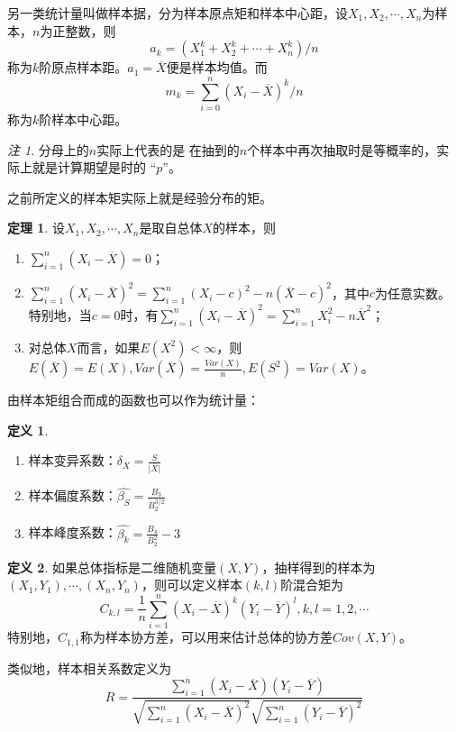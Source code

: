 \documentclass[a4paper,11pt]{article}%
\theoremstyle{remark}
\newtheorem*{remark}{注}
\theoremstyle{remark}
\theoremstyle{definition}
\newtheorem{theorem}{定理}[section]
\theoremstyle{definition}
\newtheorem*{definition}{定义}
\theoremstyle{plain}
\newcommand*{\abs}[1]{\lvert #1 \rvert}
\begin{document}
另一类统计量叫做样本据，分为样本原点矩和样本中心距，设$X_1,X_2,\cdots,X_n$为样本，$n$为正整数，则
\[a_k=(X_1^k+X_2^k+\cdots+X_n^k)/n\]
称为$k$阶原点样本距。$a_1=\overline{X}$便是样本均值。而
\[m_k=\sum_{i=0}^n(X_i-\overline{X})^k/n\]
称为$k$阶样本中心距。
\begin{remark}
    分母上的$n$实际上代表的是 在抽到的$n$个样本中再次抽取时是等概率的，实际上就是计算期望是时的 “$p$”。    
\end{remark}

之前所定义的样本矩实际上就是经验分布的矩。
\begin{theorem}
    设$X_1,X_2,\cdots,X_n$是取自总体$X$的样本，则
    \begin{enumerate}
        \item$\sum_{i=1}^n(X_i-\overline{X})=0$；
        \item$\sum_{i=1}^{n}(X_i-\overline{X})^2=\sum_{i=1}^{n}(X_i-c)^2-n(\overline{X}-c)^2$，其中$c$为任意实数。特别地，当$c=0$时，有$\sum_{i=1}^{n}(X_i-\overline{X})^2=\sum_{i=1}^{n}X_i^2-n\overline{X}^2$；
        \item 对总体$X$而言，如果$E(X^2)<\infty$，则$E(\overline{X})=E(X),Var(\overline{X})=\frac{Var(X)}{n},E(S^2)=Var(X)$。
    \end{enumerate}
\end{theorem}
由样本矩组合而成的函数也可以作为统计量：
\begin{definition}
    \begin{enumerate}
        \item 样本变异系数：$\delta_X=\frac{S}{\abs{\overline{X}}}$
        \item 样本偏度系数：$\hat{\beta_S}=\frac{B_3}{B_2^{3/2}}$
        \item 样本峰度系数：$\hat{\beta_k}=\frac{B_4}{B_2^{2}}-3$
    \end{enumerate}
\end{definition}
\begin{definition}
    如果总体指标是二维随机变量$(X,Y)$，抽样得到的样本为$(X_1,Y_1),\cdots,(X_n,Y_n)$，则可以定义样本$(k,l)$阶混合矩为
    \[C_{k,l}=\frac{1}{n}\sum_{i=1}^{n}(X_i-\overline{X})^k(Y_i-\overline{Y})^l,k,l=1,2,\cdots\]
    特别地，$C_{1,1}$称为样本协方差，可以用来估计总体的协方差$Cov(X,Y)$。

    类似地，样本相关系数定义为
    \[R=\frac{\sum_{i=1}^{n}(X_i-\overline{X})(Y_i-\overline{Y})}{\sqrt{\sum_{i=1}^{n}(X_i-\overline{X})^2}\sqrt{\sum_{i=1}^{n}(Y_i-\overline{Y})^2}}\]
\end{definition}
\end{document}
